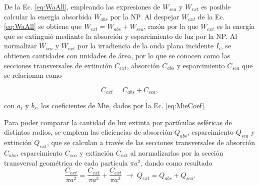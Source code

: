 De la Ec. \eqref{eq:WaAll}, empleando las expresiones de $W_{sca}$ y $W_{ext}$ es posible calcular la energía absorbida $W_{abs}$ por la NP. Al despejar $W_{ext}$ de la Ec. \eqref{eq:WaAll} se obtiene que $W_{ext} = W_{abs}+W_{sca}$, razón por la que $W_{ext}$ es la energía que se extinguió  mediante la absorción y esparcimiento de luz por la NP. Al normalizar $W_{sca}$ y $W_{ext}$ por la irradiencia de la onda plana incidente $I_i$, se obtienen cantidades con unidades de área, por lo que se conocen como las secciones transversales de extinción $C_{ext}$, absorción  $C_{abs}$ y esparcimiento $C_{sca}$ que se relacionan como \vspace*{-.75em}
	\begin{tcolorbox}[title = {Secciones transversales de extinción, absorción y esparcimiento}, breakable ]
	\begin{equation}
	C_{ext} = C_{abs} + C_{sca},
	\end{equation}	

	con $a_\ell$ y $b_\ell$, los coeficientes de Mie, dados por la Ec. \eqref{eq:MieCoef}.
	\end{tcolorbox}\vspace*{-.75em} \noindent
Para poder comparar la cantidad de luz extinta por partículas esféricas de distintos radios, se emplean las eficiencias de absorción $Q_{abs}$, esparcimiento $Q_{sca}$ y extinción $Q_{ext}$, que se calculan a través de las secciones transversales de absorción $C_{abs}$, esparcimiento $C_{sca}$ y extinción $C_{ext}$ al normalizarlas por la sección transversal geométrica de cada partícula $\pi a^2$, dando como resultado
\begin{equation}
\frac{C_{ext}}{\pi a^2} = \frac{C_{ext}}{\pi a^2}  + \frac{C_{ext}}{\pi a^2} 
\;\longrightarrow\; 	Q_{ext} = Q_{abs} + Q_{sca}.
\end{equation}

